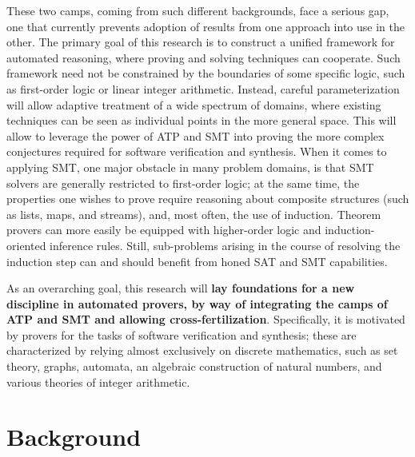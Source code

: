 \medskip
These two camps, coming from such different backgrounds,
face a serious gap,
one that currently prevents adoption of results from one approach into use in
the other.
The primary goal of this research is to construct a unified framework for automated reasoning, where proving
and solving techniques can cooperate.
Such framework need not be constrained by the boundaries of some specific logic, such as first-order logic or linear integer arithmetic.
Instead, careful parameterization will allow adaptive treatment of a wide spectrum of domains, where existing techniques can be seen as individual points in the more general space.
This will allow to leverage the power of ATP and SMT into proving the more complex
conjectures required for software verification and synthesis.
When it comes to applying SMT, one major obstacle in many problem domains, is
that SMT solvers are generally restricted to first-order logic; at the same time,
the properties one wishes to prove require reasoning about composite structures (such as lists, maps, and streams), and, most often, the use of induction.
Theorem provers can more easily be equipped with higher-order logic and induction-oriented inference
rules.
Still, sub-problems arising in the course of resolving the induction step can
and should benefit from honed SAT and SMT capabilities.

As an overarching goal, this research will \textbf{lay foundations for a new discipline
in automated provers, by way of integrating the camps of ATP and SMT and allowing
cross-fertilization}.
Specifically, it is motivated by provers for the tasks of software verification
and synthesis; these are characterized by relying almost exclusively on discrete
mathematics, such as set theory, graphs, automata, an algebraic construction of
natural numbers, and various theories of integer arithmetic.


\section{Background}


